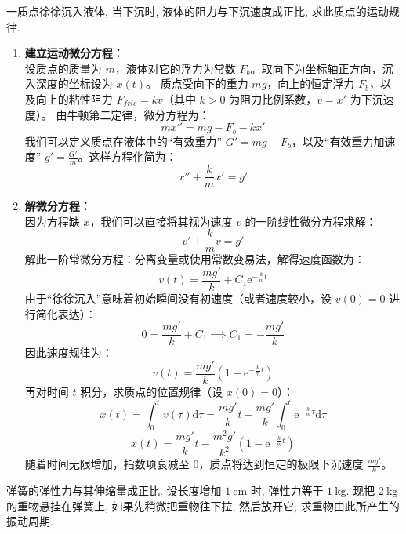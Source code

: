 \documentclass[lang=cn,11pt]{elegantbook}
\begin{document}
\begin{exercise}[一阶速度模型的降阶求解]
一质点徐徐沉入液体, 当下沉时, 液体的阻力与下沉速度成正比, 求此质点的运动规律.
\end{exercise}
\begin{solution}
\begin{enumerate}
    \item \textbf{建立运动微分方程：}\\
    设质点的质量为 $m$，液体对它的浮力为常数 $F_b$。取向下为坐标轴正方向，沉入深度的坐标设为 $x(t)$。
    质点受向下的重力 $mg$，向上的恒定浮力 $F_b$，以及向上的粘性阻力 $F_{fric} = kv$（其中 $k>0$ 为阻力比例系数，$v = x'$ 为下沉速度）。
    由牛顿第二定律，微分方程为：
    \[
    m x'' = mg - F_b - kx'
    \]
    我们可以定义质点在液体中的“有效重力” $G' = mg - F_b$，以及“有效重力加速度” $g' = \frac{G'}{m}$。这样方程化简为：
    \[
    x'' + \frac{k}{m} x' = g'
    \]
    
    \item \textbf{解微分方程：}\\
    因为方程缺 $x$，我们可以直接将其视为速度 $v$ 的一阶线性微分方程求解：
    \[
    v' + \frac{k}{m}v = g'
    \]
    解此一阶常微分方程：分离变量或使用常数变易法，解得速度函数为：
    \[
    v(t) = \frac{mg'}{k} + C_1\mathrm{e}^{-\frac{k}{m}t}
    \]
    由于“徐徐沉入”意味着初始瞬间没有初速度（或者速度较小，设 $v(0)=0$ 进行简化表达）：
    \[
    0 = \frac{mg'}{k} + C_1 \implies C_1 = -\frac{mg'}{k}
    \]
    因此速度规律为：
    \[
    v(t) = \frac{mg'}{k}\left(1 - \mathrm{e}^{-\frac{k}{m}t}\right)
    \]
    再对时间 $t$ 积分，求质点的位置规律（设 $x(0)=0$）：
    \[
    x(t) = \int_0^t v(\tau)\mathrm{d}\tau = \frac{mg'}{k}t - \frac{mg'}{k}\int_0^t \mathrm{e}^{-\frac{k}{m}\tau}\mathrm{d}\tau
    \]
    \[
    \boxed{x(t) = \frac{mg'}{k}t - \frac{m^2g'}{k^2}\left(1 - \mathrm{e}^{-\frac{k}{m}t}\right)}
    \]
    随着时间无限增加，指数项衰减至 0，质点将达到恒定的极限下沉速度 $\frac{mg'}{k}$。
\end{enumerate}
\end{solution}
\begin{exercise}
弹簧的弹性力与其伸缩量成正比. 设长度增加 $1\ \mathrm{cm}$ 时, 弹性力等于 $1\ \mathrm{kg}$. 现把 $2\ \mathrm{kg}$ 的重物悬挂在弹簧上, 如果先稍微把重物往下拉, 然后放开它, 求重物由此所产生的振动周期.
\end{exercise}
\end{document}
